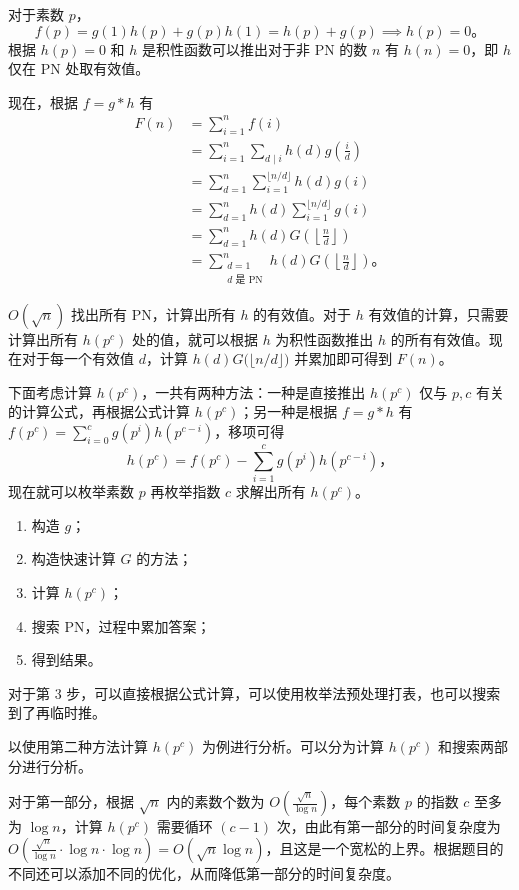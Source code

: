 对于素数 $p$，
\[
f(p) = g(1)h(p) + g(p)h(1) = h(p) + g(p) \implies h(p) = 0。
\]
根据 $h(p)=0$ 和 $h$ 是积性函数可以推出对于非 PN 的数 $n$ 有 $h(n) = 0$，即 $h$ 仅在 PN 处取有效值。

现在，根据 $f = g * h$ 有
\[
\begin{aligned}
F(n) &= \sum_{i = 1}^{n} f(i) \\
     &= \sum_{i = 1}^{n} \sum_{d\mid i} h(d) g\!\left(\frac{i}{d}\right) \\
     &= \sum_{d=1}^{n} \sum_{i=1}^{\lfloor n/d \rfloor} h(d) g(i) \\
     &= \sum_{d=1}^{n} h(d) \sum_{i=1}^{\lfloor n/d \rfloor} g(i) \\
     &= \sum_{d=1}^{n} h(d) G\!\left(\left\lfloor \frac{n}{d} \right\rfloor\right) \\
     &= \sum_{\substack{d=1 \\ d \text{ 是 PN}}}^{n} h(d) G\!\left(\left\lfloor \frac{n}{d} \right\rfloor\right)。
\end{aligned}
\]

$O(\sqrt{n})$ 找出所有 PN，计算出所有 $h$ 的有效值。对于 $h$ 有效值的计算，只需要计算出所有 $h(p^c)$ 处的值，就可以根据 $h$ 为积性函数推出 $h$ 的所有有效值。现在对于每一个有效值 $d$，计算 $h(d) G\bigl(\lfloor n/d \rfloor\bigr)$ 并累加即可得到 $F(n)$。

下面考虑计算 $h(p^c)$，一共有两种方法：一种是直接推出 $h(p^c)$ 仅与 $p, c$ 有关的计算公式，再根据公式计算 $h(p^c)$；另一种是根据 $f = g * h$ 有 $f(p^c) = \sum_{i=0}^{c} g(p^i) h(p^{c-i})$，移项可得
\[
h(p^c) = f(p^c) - \sum_{i=1}^{c} g(p^i) h(p^{c-i})，
\]
现在就可以枚举素数 $p$ 再枚举指数 $c$ 求解出所有 $h(p^c)$。

\begin{enumerate}
    \item 构造 $g$；
    \item 构造快速计算 $G$ 的方法；
    \item 计算 $h(p^c)$；
    \item 搜索 PN，过程中累加答案；
    \item 得到结果。
\end{enumerate}
对于第 3 步，可以直接根据公式计算，可以使用枚举法预处理打表，也可以搜索到了再临时推。

以使用第二种方法计算 $h(p^c)$ 为例进行分析。可以分为计算 $h(p^c)$ 和搜索两部分进行分析。

对于第一部分，根据 $\sqrt{n}$ 内的素数个数为 $O\!\left(\frac{\sqrt{n}}{\log n}\right)$，每个素数 $p$ 的指数 $c$ 至多为 $\log n$，计算 $h(p^c)$ 需要循环 $(c-1)$ 次，由此有第一部分的时间复杂度为 $O\!\left(\frac{\sqrt{n}}{\log n} \cdot \log n \cdot \log n\right) = O(\sqrt{n}\log n)$，且这是一个宽松的上界。根据题目的不同还可以添加不同的优化，从而降低第一部分的时间复杂度。


